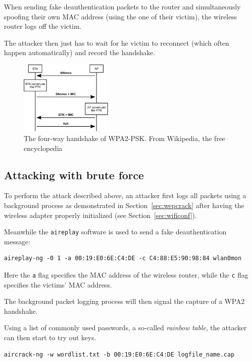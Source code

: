 When sending fake deauthentication packets to the router and simultaneously spoofing their own MAC address (using the one of their victim), the wireless router logs off the victim.

The attacker then just has to wait for he victim to reconnect (which often happen automatically) and record the handshake.

\begin{figure}
\includegraphics[width=0.4\textwidth]{src/img/4-way-handshake.png}
\caption{The four-way handshake of WPA2-PSK. From Wikipedia, the free encyclopedia~\cite{Mikm07}}\label{fig:wpa2fway}
\end{figure}

\subsection{Attacking with brute force}\label{sec:wpa2brute}

To perform the attack described above, an attacker first logs all packets using a background process as demonstrated in Section~\ref{sec:wepcrack} after having the wireless adapter properly initialized (see Section~\ref{sec:wificonf}).

Meanwhile the \lstinline{aireplay} software is used to send a fake deauthentication message:

\begin{lstlisting}
aireplay-ng -0 1 -a 00:19:E0:6E:C4:DE -c C4:88:E5:90:98:84 wlan0mon
\end{lstlisting}

Here the \lstinline{a} flag specifies the MAC address of the wireless router, while the \lstinline{c} flag specifies the victims' MAC address.

The background packet logging process will then signal the capture of a WPA2 handshake.

Using a list of commonly used passwords, a so-called \emph{rainbow table}, the attacker can then start to try out keys.

\begin{lstlisting}
aircrack-ng -w wordlist.txt -b 00:19:E0:6E:C4:DE logfile_name.cap
\end{lstlisting}

